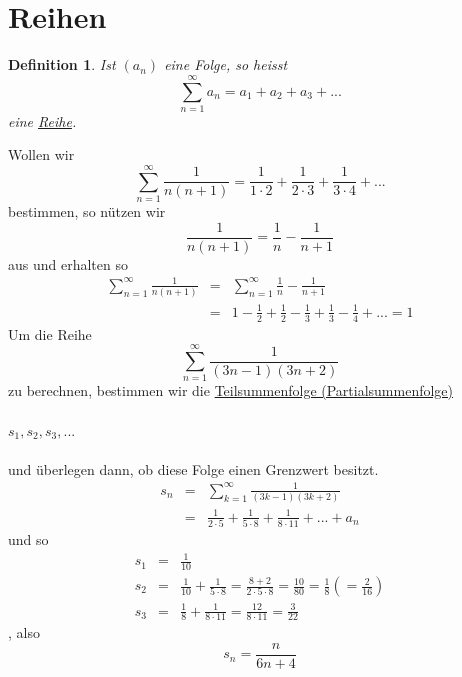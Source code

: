 \documentclass{report}
\newtheorem{mydef}{Definition}
\begin{document}
\section{Reihen}
\begin{mydef}Ist $(a_n)$ eine Folge, so heisst
\begin{equation}\sum_{n=1}^{\infty}a_n = a_1 + a_2 + a_3 + ...\end{equation}
eine \underline{Reihe}.\end{mydef}
Wollen wir
\begin{equation}\sum_{n=1}^{\infty}\frac{1}{n (n+1)} = \frac{1}{1 \cdot 2} + \frac{1}{2 \cdot 3} + \frac{1}{3 \cdot 4} + ...\end{equation}
bestimmen, so nützen wir
\begin{equation}\frac{1}{n(n+1)} = \frac{1}{n}-\frac{1}{n+1}\end{equation}
aus und erhalten so
\begin{eqnarray}\sum_{n=1}^{\infty} \frac{1}{n (n+1)} & = & \sum_{n=1}^{\infty} \frac{1}{n}-\frac{1}{n+1}\nonumber \\
& = & 1 - \frac{1}{2} + \frac{1}{2} - \frac{1}{3} + \frac{1}{3} - \frac{1}{4} + ... = 1\end{eqnarray}
Um die Reihe
\begin{equation}\sum_{n=1}^{\infty} \frac{1}{(3n-1)(3n+2)}\end{equation}
zu berechnen, bestimmen wir die \underline{Teilsummenfolge (Partialsummenfolge)}
\\\\$s_1, s_2, s_3, ...$\\\\
und überlegen dann, ob diese Folge einen Grenzwert besitzt.
\begin{eqnarray}s_n & = & \sum_{k=1}^{\infty} \frac{1}{(3k-1)(3k+2)} \nonumber \\
&=& \frac{1}{2 \cdot 5} + \frac{1}{5 \cdot 8} + \frac{1}{8 \cdot 11} + ... + a_n\end{eqnarray}
und so
\begin{eqnarray}s_1 & = & \frac{1}{10} \nonumber \\
s_2 & = & \frac{1}{10} + \frac{1}{5 \cdot 8} = \frac{8+2}{2 \cdot 5 \cdot 8} = \frac{10}{80} = \frac{1}{8} (= \frac{2}{16}) \nonumber \\
s_3 & = & \frac{1}{8} + \frac{1}{8 \cdot 11} = \frac{12}{8 \cdot 11} = \frac{3}{22}\end{eqnarray}
, also
\begin{equation}s_n = \frac{n}{6n+4}\end{equation}
\end{document}
